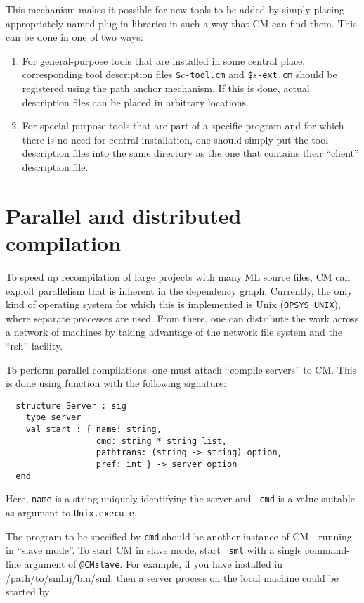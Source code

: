 \documentclass[titlepage,letterpaper]{article}
\begin{document}
This mechanism makes it possible for new tools to be added by simply
placing appropriately-named plug-in libraries in such a way that CM
can find them.  This can be done in one of two ways:

\begin{enumerate}
\item For general-purpose tools that are installed in some central
place, corresponding tool description files {\tt \$}$c${\tt -tool.cm}
and {\tt \$}$s${\tt -ext.cm} should be registered using the path
anchor mechanism.  If this is done, actual description files can be
placed in arbitrary locations.
\item For special-purpose tools that are part of a specific program
and for which there is no need for central installation, one should
simply put the tool description files into the same directory as the
one that contains their ``client'' description file.
\end{enumerate}

\section{Parallel and distributed compilation}
\label{sec:parmake}

To speed up recompilation of large projects with many ML source files,
CM can exploit parallelism that is inherent in the dependency graph.
Currently, the only kind of operating system for which this is
implemented is Unix ({\tt OPSYS\_UNIX}), where separate processes are
used.  From there, one can distribute the work across a network of
machines by taking advantage of the network file system and the
``rsh'' facility.

To perform parallel compilations, one must attach ``compile servers''
to CM.  This is done using function
with the following signature:

\begin{verbatim}
  structure Server : sig
    type server
    val start : { name: string,
                  cmd: string * string list,
                  pathtrans: (string -> string) option,
                  pref: int } -> server option
  end
\end{verbatim}

Here, {\tt name} is a string uniquely identifying the server and {\tt
cmd} is a value suitable as argument to {\tt Unix.execute}.

The program to be specified by {\tt cmd} should be another instance of
CM---running in ``slave mode''.  To start CM in slave mode, start {\tt
sml} with a single command-line argument of {\tt @CMslave}.  For
example, if you have installed in /path/to/smlnj/bin/sml, then a
server process on the local machine could be started by
\end{document}
